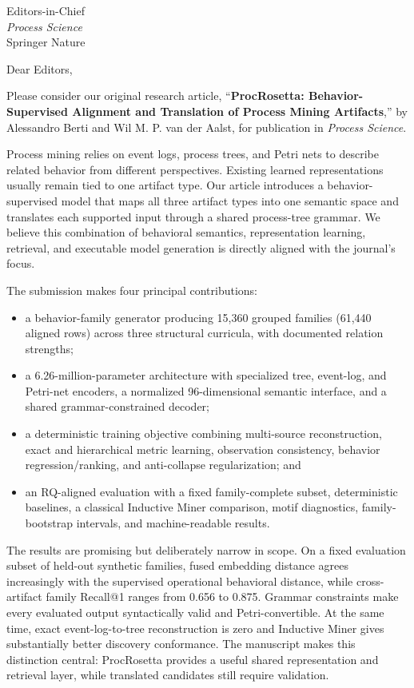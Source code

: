 \documentclass[11pt]{letter}
\date{1 September 2026}
\begin{document}
\begin{letter}{Editors-in-Chief\\\textit{Process Science}\\Springer Nature}

\opening{Dear Editors,}

Please consider our original research article, ``\textbf{ProcRosetta: Behavior-Supervised Alignment and Translation of Process Mining Artifacts},'' by Alessandro Berti and Wil M. P. van der Aalst, for publication in \textit{Process Science}.

Process mining relies on event logs, process trees, and Petri nets to describe related behavior from different perspectives. Existing learned representations usually remain tied to one artifact type. Our article introduces a behavior-supervised model that maps all three artifact types into one semantic space and translates each supported input through a shared process-tree grammar. We believe this combination of behavioral semantics, representation learning, retrieval, and executable model generation is directly aligned with the journal's focus.

The submission makes four principal contributions:

\begin{itemize}[leftmargin=1.6em,itemsep=0.25em,topsep=0.2em]
\item a behavior-family generator producing 15,360 grouped families (61,440 aligned rows) across three structural curricula, with documented relation strengths;
\item a 6.26-million-parameter architecture with specialized tree, event-log, and Petri-net encoders, a normalized 96-dimensional semantic interface, and a shared grammar-constrained decoder;
\item a deterministic training objective combining multi-source reconstruction, exact and hierarchical metric learning, observation consistency, behavior regression/ranking, and anti-collapse regularization; and
\item an RQ-aligned evaluation with a fixed family-complete subset, deterministic baselines, a classical Inductive Miner comparison, motif diagnostics, family-bootstrap intervals, and machine-readable results.
\end{itemize}

The results are promising but deliberately narrow in scope. On a fixed evaluation subset of held-out synthetic families, fused embedding distance agrees increasingly with the supervised operational behavioral distance, while cross-artifact family Recall@1 ranges from 0.656 to 0.875. Grammar constraints make every evaluated output syntactically valid and Petri-convertible. At the same time, exact event-log-to-tree reconstruction is zero and Inductive Miner gives substantially better discovery conformance. The manuscript makes this distinction central: ProcRosetta provides a useful shared representation and retrieval layer, while translated candidates still require validation.


\end{letter}
\end{document}
